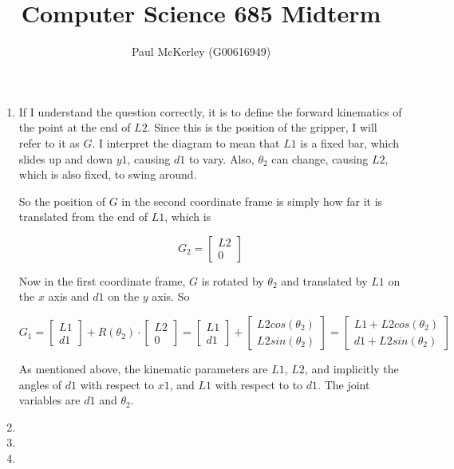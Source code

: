 \documentclass[letter,8pt]{article}
\begin{document}
\title{Computer Science 685 Midterm}
\author{Paul McKerley (G00616949)}
\selectfont
\frenchspacing

\maketitle 

\begin{enumerate} 

\item If I understand the question correctly, it is to define the
  forward kinematics of the point at the end of $L2$. Since this is
  the position of the gripper, I will refer to it as $G$. I interpret
  the diagram to mean that $L1$ is a fixed bar, which slides up and
  down $y1$, causing $d1$ to vary. Also, $\theta_2$ can change,
  causing $L2$, which is also fixed, to swing around.

  So the position of $G$ in the second coordinate frame is simply how
  far it is translated from the end of $L1$, which is

\[
    G_2 = 
    \begin{bmatrix}
        L2\\
        0
    \end{bmatrix} 
\]

  Now in the first coordinate frame, $G$ is rotated by $\theta_2$ and
  translated by $L1$ on the $x$ axis and $d1$ on the $y$ axis. So

  \[
  G_1 = \begin{bmatrix}
    L1\\
    d1
  \end{bmatrix} + R(\theta_2) \cdot     \begin{bmatrix}
        L2\\
        0
    \end{bmatrix}  = \begin{bmatrix}
    L1\\
    d1
  \end{bmatrix} + \begin{bmatrix}
    L2 cos(\theta_2)\\
    L2 sin(\theta_2)
  \end{bmatrix} = \begin{bmatrix}
    L1 + L2 cos(\theta_2)\\
    d1 + L2 sin(\theta_2)
  \end{bmatrix}
  \]

As mentioned above, the kinematic parameters are $L1$, $L2$, and
implicitly the angles of $d1$ with respect to $x1$, and $L1$ with
respect to to $d1$. The joint variables are $d1$ and $\theta_2$.

\item 

\item 

\item 

\end{enumerate}
\end{document}

